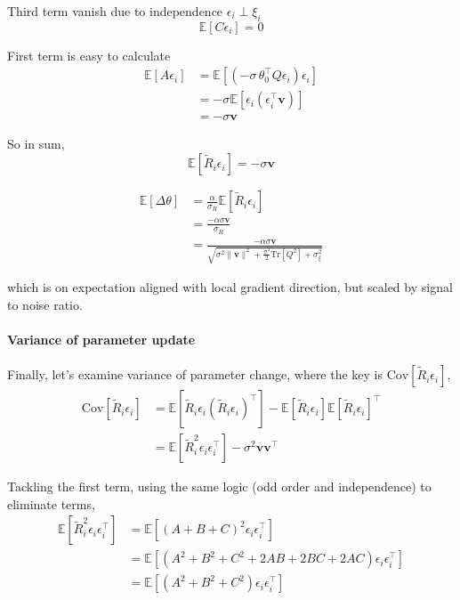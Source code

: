     Third term vanish due to independence $\epsilon_{i}\perp\xi_{i}$
    \[
    \mathbb{E}[C\epsilon_{i}]=0
    \]
    
    First term is easy to calculate 
    \begin{align*}
    \mathbb{E}[A\epsilon_{i}] & =\mathbb{E}[(-\sigma\,\theta_{0}^{\top}Q\epsilon_{i})\epsilon_{i}]\\
     & =-\sigma\mathbb{E}[\epsilon_{i}(\epsilon_{i}^{\top}\mathbf{v})]\\
     & =-\sigma\mathbf{v}
    \end{align*}
    
    So in sum, 
    \[
    \mathbb{E}[\tilde{R}_{i}\epsilon_{i}]=-\sigma\mathbf{v}
    \]
    
    \begin{align*}
    \mathbb{E}[\Delta\theta] & =\frac{\alpha}{\sigma_{R}}\mathbb{E}[\tilde{R}_{i}\epsilon_{i}]\\
     & =\frac{-\alpha\sigma\mathbf{v}}{\sigma_{R}}\\
     & =\frac{-\alpha\sigma\mathbf{v}}{\sqrt{\sigma^{2}\|\mathbf{v}\|^{2}+\frac{\sigma^{4}}{2}\mathrm{Tr}[Q^{2}]+\sigma_{\xi}^{2}}}
    \end{align*}
    
    which is on expectation aligned with local gradient direction, but
    scaled by signal to noise ratio. 
    
    \paragraph{Variance of parameter update}
    
    Finally, let's examine variance of parameter change, where the key
    is $\mathrm{Cov}[\tilde{R}_{i}\epsilon_{i}]$,
    \begin{align*}
    \mathrm{Cov}[\tilde{R}_{i}\epsilon_{i}] & =\mathbb{E}[\tilde{R}_{i}\epsilon_{i}(\tilde{R}_{i}\epsilon_{i})^{\top}]-\mathbb{E}[\tilde{R}_{i}\epsilon_{i}]\mathbb{E}[\tilde{R}_{i}\epsilon_{i}]^{\top}\\
     & =\mathbb{E}[\tilde{R}_{i}^{2}\epsilon_{i}\epsilon_{i}^{\top}]-\sigma^{2}\mathbf{v}\mathbf{v}^{\top}
    \end{align*}
    
    Tackling the first term, using the same logic (odd order and independence)
    to eliminate terms, 
    \begin{align*}
    \mathbb{E}[\tilde{R}_{i}^{2}\epsilon_{i}\epsilon_{i}^{\top}] & =\mathbb{E}[(A+B+C)^{2}\epsilon_{i}\epsilon_{i}^{\top}]\\
     & =\mathbb{E}[(A^{2}+B^{2}+C^{2}+2AB+2BC+2AC)\epsilon_{i}\epsilon_{i}^{\top}]\\
     & =\mathbb{E}[(A^{2}+B^{2}+C^{2})\epsilon_{i}\epsilon_{i}^{\top}]
    \end{align*}
    
